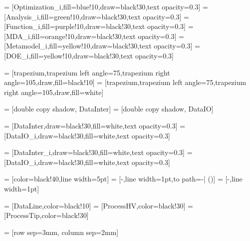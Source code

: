  = [Optimization_i,fill=blue!10,draw=black!30,text opacity=0.3]
 = [Analysis_i,fill=green!10,draw=black!30,text opacity=0.3]
 = [Function_i,fill=purple!10,draw=black!30,text opacity=0.3]
 = [MDA_i,fill=orange!10,draw=black!30,text opacity=0.3]
 = [Metamodel_i,fill=yellow!10,draw=black!30,text opacity=0.3]
 = [DOE_i,fill=yellow!10,draw=black!30,text opacity=0.3]

 = [trapezium,trapezium left angle=75,trapezium right angle=105,draw,fill=black!10]
 = [trapezium,trapezium left angle=75,trapezium right angle=105,draw,fill=white]

 = [double copy shadow, DataInter]
 = [double copy shadow, DataIO]

 = [DataInter,draw=black!30,fill=white,text opacity=0.3]
 = [DataIO_i,draw=black!30,fill=white,text opacity=0.3]

 = [DataInter_i,draw=black!30,fill=white,text opacity=0.3]
 = [DataIO_i,draw=black!30,fill=white,text opacity=0.3]

 = [color=black!40,line width=5pt]
 = [-,line width=1pt,to path={-| (\tikztotarget)}]
 = [-,line width=1pt]

 = [DataLine,color=black!10]
 = [ProcessHV,color=black!30]
 = [ProcessTip,color=black!30]

 = [row sep=3mm, column sep=2mm]


\newcommand{\MultilineComponent}[3]
{
	\begin{minipage}{#1}
	\begin{center}
		#2 \linebreak #3
	\end{center}
	\end{minipage}
}

